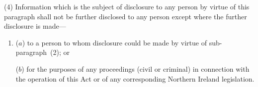 \documentclass[12pt,a4paper]{article}
\begin{document}
(4) Information which is the subject of disclosure to any person by virtue of this paragraph shall not be further disclosed to any person except where the further disclosure is made—
\begin{enumerate}\item[]
($a$) to a person to whom disclosure could be made by virtue of sub-\hspace{0pt}paragraph~(2); or

($b$) for the purposes of any proceedings (civil or criminal) in connection with the operation of this Act or of any corresponding Northern Ireland legislation.
\end{enumerate}

\end{document}
